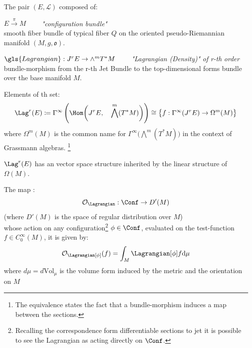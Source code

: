 \documentclass[a4paper,11pt]{scrartcl}
\begin{document}
	\begin{definition}
		The pair $(E, \mathcal{L} )$ composed of:
		\begin{compactitemize}
			\item $E \xrightarrow{\pi} M \qquad$ \emph{"configuration bundle"}\\
			smooth fiber bundle of typical fiber $Q$ on the oriented pseudo-Riemannian manifold $(M,g,\mathfrak{o})$.
			\item	$ \gls{Lagrangian} : J^r E \rightarrow \wedge^m T^*M \qquad$ \emph{"Lagrangian (Density)" of r-th order}\\
			bundle-morphism from the r-th Jet Bundle to  the top-dimensional forms bundle over the base manifold $M$.
		\end{compactitemize}
	\end{definition}

	\begin{definition}\label{Def:LagrangianDensities}
		Elements of th set:
		\begin{displaymath}
			\Lag^r (E) \coloneqq \Gamma^\infty \left( \Hom\biggr(J^r E,\quad \bigwedge^m( T^*M)\biggr) \right) \cong \big\{f:\Gamma^\infty(J^r E) \rightarrow \Omega^m(M)  \big\}
		\end{displaymath}
		where $\Omega^m(M)$ is the common name for $\Gamma^\infty \big( \bigwedge^m( T^*M) \big)$ in the context of Grassmann algebras.
		\footnote{	The equivalence states the fact that a bundle-morphism induces a map between the sections.}
	\end{definition}
	\begin{proposition}
		$\Lag^r(E)$ has an vector space structure inherited by the linear structure of $\Omega(M)$.
	\end{proposition}

	\begin{definition}\label{Def:LagrangianFunctionals}
		The map :
		\begin{displaymath}
			\mathcal{O}_\Lagrangian : \Conf \rightarrow D'(M)
		\end{displaymath}
		(where  $D'(M)$ is the space of regular distribution over $M$)\\
		whose action on any configuration\footnote{Recalling the correspondence form differentiable sections to jet it is possible to see the Lagrangian as acting directly on $\Conf$.} 
		$\phi \in \Conf$, evaluated on the test-function $f \in C^\infty_0(M)$, it is given by:
		\begin{displaymath}
			\mathcal{O}_\Lagrangian [\phi] (f) = \int_M \Lagrangian [\phi] f \textrm{d}\mu
		\end{displaymath}
		where $d\mu = d\textrm{Vol}_\mu$ is the volume form induced by the metric and the orientation on $M$
	\end{definition}
\end{document}
